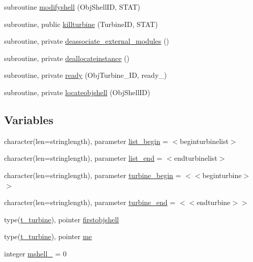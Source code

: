 \begin{DoxyCompactItemize}
\item 
subroutine \mbox{\hyperlink{namespacemoduleturbine_a1d4106d55d966d87476e3ddbb2fc33b0}{modifyshell}} (Obj\+Shell\+ID, S\+T\+AT)
\item 
subroutine, public \mbox{\hyperlink{namespacemoduleturbine_a14dcb5e2f0dfed8ce2da9616f01b2a58}{killturbine}} (Turbine\+ID, S\+T\+AT)
\item 
subroutine, private \mbox{\hyperlink{namespacemoduleturbine_a9ba3c2694581c5c8d730d5cacd9c2a61}{deassociate\+\_\+external\+\_\+modules}} ()
\item 
subroutine, private \mbox{\hyperlink{namespacemoduleturbine_af2af37c97b47092470d2bf90bd9bc56e}{deallocateinstance}} ()
\item 
subroutine, private \mbox{\hyperlink{namespacemoduleturbine_a05e91853a3be1ed656ff05d69618a83d}{ready}} (Obj\+Turbine\+\_\+\+ID, ready\+\_\+)
\item 
subroutine, private \mbox{\hyperlink{namespacemoduleturbine_ad69845ea1216f04acc515267e6a71770}{locateobjshell}} (Obj\+Shell\+ID)
\end{DoxyCompactItemize}
\subsection*{Variables}
\begin{DoxyCompactItemize}
\item 
character(len=stringlength), parameter \mbox{\hyperlink{namespacemoduleturbine_ad04636802bac2f3c19dff855eca9c9dc}{list\+\_\+begin}} = \textquotesingle{}$<$beginturbinelist$>$\textquotesingle{}
\item 
character(len=stringlength), parameter \mbox{\hyperlink{namespacemoduleturbine_a9c4747fd12e7bf415c89aca4386a391e}{list\+\_\+end}} = \textquotesingle{}$<$endturbinelist$>$\textquotesingle{}
\item 
character(len=stringlength), parameter \mbox{\hyperlink{namespacemoduleturbine_a62168195f6951bb643ae2ea10c2b04c8}{turbine\+\_\+begin}} = \textquotesingle{}$<$$<$beginturbine$>$$>$\textquotesingle{}
\item 
character(len=stringlength), parameter \mbox{\hyperlink{namespacemoduleturbine_acd41e1d7b88aa9d9d9ecdbf51a563711}{turbine\+\_\+end}} = \textquotesingle{}$<$$<$endturbine$>$$>$\textquotesingle{}
\item 
type(\mbox{\hyperlink{structmoduleturbine_1_1t__turbine}{t\+\_\+turbine}}), pointer \mbox{\hyperlink{namespacemoduleturbine_a858f94cb0c630187cc84a6e706f9ac32}{firstobjshell}}
\item 
type(\mbox{\hyperlink{structmoduleturbine_1_1t__turbine}{t\+\_\+turbine}}), pointer \mbox{\hyperlink{namespacemoduleturbine_a49ad1250ab40f9f964278793bcff42e0}{me}}
\item 
integer \mbox{\hyperlink{namespacemoduleturbine_a6ecd7a89c88a447b97a33fcfc0a731a7}{mshell\+\_\+}} = 0
\end{DoxyCompactItemize}


